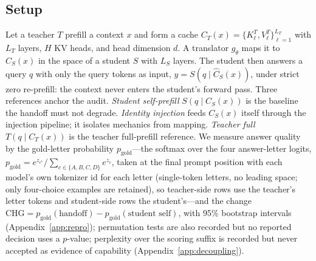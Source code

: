 \documentclass{article} %
\newcommand{\chg}{\mathrm{CHG}}
\newcommand{\gold}{p_{\mathrm{gold}}}
\begin{document}
\subsection{Setup}
Let a teacher $T$ prefill a context $x$ and form a cache
$C_T(x) = \{K^T_\ell, V^T_\ell\}_{\ell=1}^{L_T}$ with $L_T$ layers, $H$ KV
heads, and head dimension $d$. A translator $g_\theta$ maps it to
$\widehat{C}_S(x)$ in the space of a student $S$ with $L_S$ layers. The
student then answers a query $q$ with only the query tokens as input,
$\hat{y} = S(q \mid \widehat{C}_S(x))$, under strict zero re-prefill: the
context never enters the student's forward pass. Three references anchor the
audit. \emph{Student self-prefill} $S(q \mid C_S(x))$ is the baseline the
handoff must not degrade. \emph{Identity injection} feeds $C_S(x)$ itself
through the injection pipeline; it isolates mechanics from mapping.
\emph{Teacher full} $T(q \mid C_T(x))$ is the teacher full-prefill reference. We
measure answer quality by the gold-letter probability $\gold$---the softmax over
the four answer-letter logits,
$\gold = e^{z_{c^\star}}/\sum_{c \in \{A,B,C,D\}} e^{z_c}$, taken at the final
prompt position with each model's own tokenizer id for each letter (single-token
letters, no leading space; only four-choice examples are retained), so teacher-side rows use the teacher's letter tokens
and student-side rows the student's---and the change
$\chg = \gold(\text{handoff}) - \gold(\text{student self})$, with
95\% bootstrap intervals (Appendix~\ref{app:repro}); permutation tests are also
recorded but no reported decision uses a $p$-value; perplexity over the
scoring suffix is recorded but never accepted as evidence of capability
(Appendix~\ref{app:decoupling}).
\end{document}
